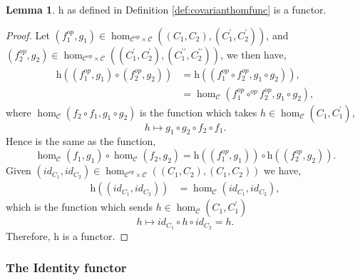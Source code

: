 \documentclass[11pt,a4paper]{article}
\theoremstyle{definition}
\newtheorem{lemma}[thm]{Lemma}
\newcommand\ho[3][]{\hom_{#1}(#2,#3)}
\newcommand\cat[1]{\mathscr{#1}}
\numberwithin{equation}{section}
\begin{document}
\begin{lemma}
    \label{lem:covhomfunc}
    $\mathrm{h}$ as defined in Definition \ref{def:covarianthomfunc} is a functor.
\end{lemma}
\begin{proof}
    Let $(f^{op}_1,g_1)\in\ho[\cat{C}^{op}\times\cat{C}]{(C_1,C_2)}{(C_1^\prime,C_2^\prime)}$, and $(f^{op}_2,g_2)\in\ho[\cat{C}^{op}\times\cat{C}]{(C_1^\prime,C_2^\prime)}{(C_1^{\prime\prime},C_2^{\prime\prime})}$, we then have,
    \begin{align*}
        \mathrm{h}((f^{op}_1,g_1)\circ(f^{op}_2,g_2)) &= \mathrm{h}((f^{op}_1\circ f^{op}_2,g_1\circ g_2)), \\
        &= \ho[\cat{C}]{f^{op}_1\circ^{op} f^{op}_2}{g_1\circ g_2},
    \end{align*}
    where $\ho[\cat{C}]{f_2\circ f_1}{g_1\circ g_2}$ is the function which takes $h\in\ho[\cat{C}]{C_1}{C_1^\prime}$,
    \[h\mapsto g_1\circ g_2 \circ f_2\circ f_1.\]
    Hence is the same as the function,
    \[\ho[\cat{C}]{f_1}{g_1} \circ \ho[\cat{C}]{f_2}{g_2} = \mathrm{h}((f^{op}_1,g_1))\circ \mathrm{h}((f^{op}_2,g_2)).\]
    Given $(id_{C_1},id_{C_2})\in\ho[\cat{C}^{op}\times\cat{C}]{(C_1,C_2)}{(C_1,C_2)}$ we have,
    \begin{align*}
        \mathrm{h}((id_{C_1},id_{C_2})) &= \ho[\cat{C}]{id_{C_1}}{id_{C_2}},
    \end{align*}
    which is the function which sends $h\in\ho[\cat{C}]{C_1}{C_1^\prime}$
    \[h\mapsto id_{C_1} \circ h \circ id_{C_2} = h.\]
    Therefore, $\mathrm{h}$ is a functor.
\end{proof}

\subsubsection{The Identity functor}
\label{sss:identityfunctor}
\end{document}
